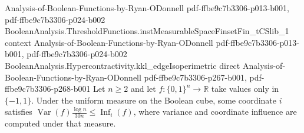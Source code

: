 \begin{lemma}
  {Analysis-of-Boolean-Functions-by-Ryan-ODonnell}
  {pdf-ffbe9c7b3306-p013-b001,
    pdf-ffbe9c7b3306-p024-b002}
\proofstep
  {BooleanAnalysis.ThresholdFunctions.instMeasurableSpaceFinsetFin_tCSlib_1}
  {context}
  {Analysis-of-Boolean-Functions-by-Ryan-ODonnell}
  {pdf-ffbe9c7b3306-p013-b001,
    pdf-ffbe9c7b3306-p024-b002}
\proofstep
  {BooleanAnalysis.Hypercontractivity.kkl_edgeIsoperimetric}
  {direct}
  {Analysis-of-Boolean-Functions-by-Ryan-ODonnell}
  {pdf-ffbe9c7b3306-p267-b001,
    pdf-ffbe9c7b3306-p268-b001}
Let $n\ge2$ and let $f:\{0,1\}^n\to\mathbb R$ take values only in $\{-1,1\}$. Under the
uniform measure on the Boolean cube, some coordinate $i$ satisfies
$\operatorname{Var}(f)\frac{\log n}{30n}\le\operatorname{Inf}_i(f)$, where variance and
coordinate influence are computed under that measure.
\end{lemma}

